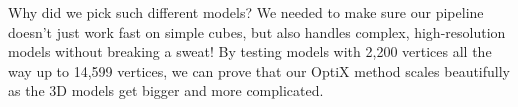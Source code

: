Why did we pick such different models? We needed to make sure our pipeline doesn't just work fast on simple cubes, but also handles complex, high-resolution models without breaking a sweat! By testing models with 2,200 vertices all the way up to 14,599 vertices, we can prove that our OptiX method scales beautifully as the 3D models get bigger and more complicated.
